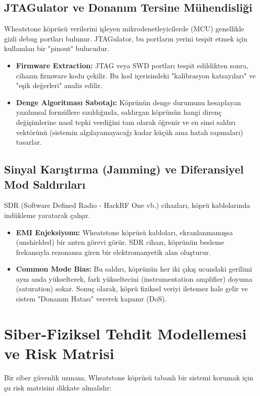 \documentclass[12pt,a4paper]{article}
\begin{document}
\subsection{JTAGulator ve Donanım Tersine Mühendisliği}
Wheatstone köprüsü verilerini işleyen mikrodenetleyicilerde (MCU) genellikle gizli debug portları bulunur. JTAGulator, bu portların yerini tespit etmek için kullanılan bir "pinout" bulucudur.

\begin{itemize}
    \item \textbf{Firmware Extraction:} JTAG veya SWD portları tespit edildikten sonra, cihazın firmware kodu çekilir. Bu kod içerisindeki "kalibrasyon katsayıları" ve "eşik değerleri" analiz edilir.
    \item \textbf{Denge Algoritması Sabotajı:} Köprünün denge durumunu hesaplayan yazılımsal formüllere sızıldığında, saldırgan köprünün hangi direnç değişimlerine nasıl tepki verdiğini tam olarak öğrenir ve en sinsi saldırı vektörünü (sistemin algılayamayacağı kadar küçük ama hatalı sapmaları) tasarlar.
\end{itemize}



\subsection{Sinyal Karıştırma (Jamming) ve Diferansiyel Mod Saldırıları}
SDR (Software Defined Radio - HackRF One vb.) cihazları, köprü kablolarında indükleme yaratarak çalışır.

\begin{itemize}
    \item \textbf{EMI Enjeksiyonu:} Wheatstone köprüsü kabloları, ekranlanmamışsa (unshielded) bir anten görevi görür. SDR cihazı, köprünün besleme frekansıyla rezonansa giren bir elektromanyetik alan oluşturur.
    \item \textbf{Common Mode Bias:} Bu saldırı, köprünün her iki çıkış ucundaki gerilimi aynı anda yükselterek, fark yükseltecini (instrumentation amplifier) doyuma (saturation) sokar. Sonuç olarak, köprü fiziksel veriyi iletemez hale gelir ve sistem "Donanım Hatası" vererek kapanır (DoS).
\end{itemize}

\section{Siber-Fiziksel Tehdit Modellemesi ve Risk Matrisi}
Bir siber güvenlik uzmanı, Wheatstone köprüsü tabanlı bir sistemi korumak için şu risk matrisini dikkate almalıdır:
\end{document}
